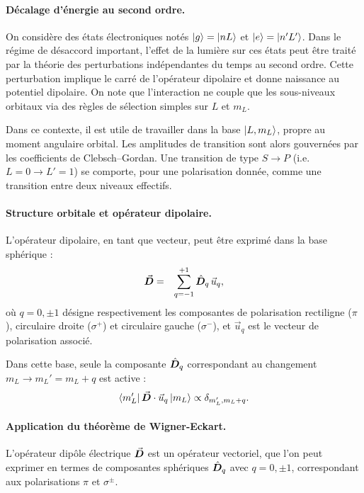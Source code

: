 \paragraph{Décalage d’énergie au second ordre.}
On considère des états électroniques notés $\ket{g} = \ket{nL}$ et $\ket{e} = \ket{n'L'}$. Dans le régime de désaccord important, l’effet de la lumière sur ces états peut être traité par la théorie des perturbations indépendantes du temps au second ordre. Cette perturbation implique le carré de l’opérateur dipolaire et donne naissance au potentiel dipolaire. On note que l’interaction ne couple que les sous-niveaux orbitaux via des règles de sélection simples sur $L$ et $m_L$.

Dans ce contexte, il est utile de travailler dans la base $\ket{L, m_L}$, propre au moment angulaire orbital. Les amplitudes de transition sont alors gouvernées par les coefficients de Clebsch–Gordan. Une transition de type $S \rightarrow P$ (i.e. $L = 0 \to L' = 1$) se comporte, pour une polarisation donnée, comme une transition entre deux niveaux effectifs.

\paragraph{Structure orbitale et opérateur dipolaire.}

L’opérateur dipolaire, en tant que vecteur, peut être exprimé dans la base sphérique :
\begin{eqnarray*}
\vec{{\bm{D}}} &=& \sum_{q = -1}^{+1} \hat{\bm{D}}_q\, \vec{u}_q,
\end{eqnarray*}
où $q = 0, \pm 1$ désigne respectivement les composantes de polarisation rectiligne ($\pi$), circulaire droite ($\sigma^+$) et circulaire gauche ($\sigma^-$), et $\vec{u}_q$ est le vecteur de polarisation associé.

Dans cette base, seule la composante $\hat{\bm{D}}_q$ correspondant au changement $m_L \to m_L' = m_L + q$ est active :
\begin{eqnarray*}
\bra{m_L'} \vec{{\bm{D}}} \cdot \vec{u}_q \ket{m_L} \propto \delta_{m_L', m_L + q}.
\end{eqnarray*}

\paragraph{Application du théorème de Wigner-Eckart.}

L’opérateur dipôle électrique $\vec{{\bm{D}}}$ est un opérateur vectoriel, que l’on peut exprimer en termes de composantes sphériques $\hat{\bm{D}}_q$ avec $q = 0 , \pm 1 $, correspondant aux polarisations $\pi$  et $\sigma^\pm$.

